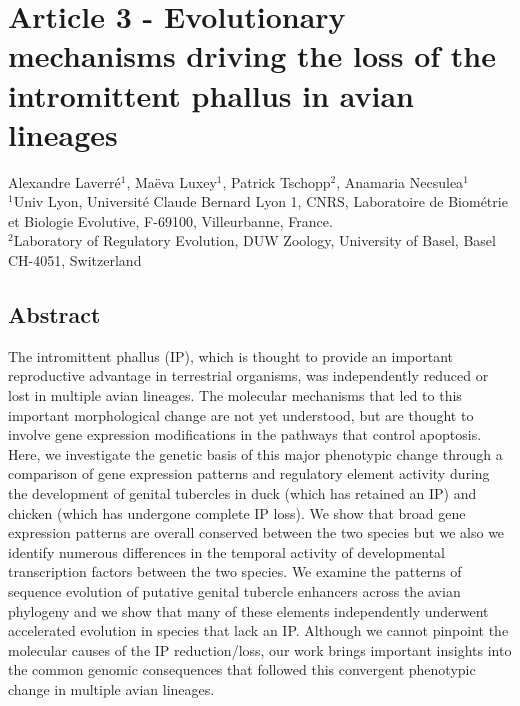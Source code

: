 \chapter{Article 3 - Evolutionary mechanisms driving the loss of the intromittent phallus in avian lineages}
\label{IPLOSS}

\begin{center}
 \large Alexandre Laverré$^{\text{1}}$, Maëva Luxey$^{\text{1}}$, Patrick Tschopp$^{\text{2}}$, Anamaria Necsulea$^{\text{1}}$\\
 \vspace{0.5cm}
 \normalsize
 $^{\text{1}}$Univ Lyon, Université Claude Bernard Lyon 1, CNRS, Laboratoire de Biométrie et Biologie Evolutive, F-69100, Villeurbanne, France.\\
 $^{\text{2}}$Laboratory of Regulatory Evolution, DUW Zoology, University of Basel, Basel CH-4051, Switzerland\\
\end{center}

{\hypersetup{linkcolor=GREYDARK}\minitoc}

\section{Abstract}
The intromittent phallus (IP), which is thought to provide an important reproductive advantage in terrestrial organisms, was independently reduced or lost in multiple avian lineages. The molecular mechanisms that led to this important morphological change are not yet understood, but are thought to involve gene expression modifications in the pathways that control apoptosis. Here, we investigate the genetic basis of this major phenotypic change through a comparison of gene expression patterns and regulatory element activity during the development of genital tubercles in duck (which has retained an IP) and chicken (which has undergone complete IP loss). We show that broad gene expression patterns are overall conserved between the two species but we also we identify numerous differences in the temporal activity of developmental transcription factors between the two species. We examine the patterns of sequence evolution of putative genital tubercle enhancers across the avian phylogeny and we show that many of these elements independently underwent accelerated evolution in species that lack an IP. Although we cannot pinpoint the molecular causes of the IP reduction/loss, our work brings important insights into the common genomic consequences that followed this convergent phenotypic change in multiple avian lineages.

